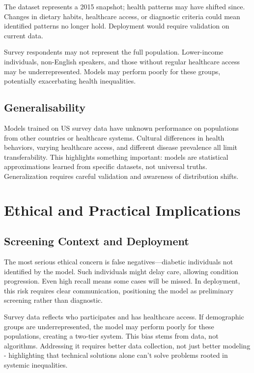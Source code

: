 \documentclass[12pt,a4paper]{article}
\begin{document}
The dataset represents a 2015 snapshot; health patterns may have shifted since. Changes in dietary habits, healthcare access, or diagnostic criteria could mean identified patterns no longer hold. Deployment would require validation on current data.

Survey respondents may not represent the full population. Lower-income individuals, non-English speakers, and those without regular healthcare access may be underrepresented. Models may perform poorly for these groups, potentially exacerbating health inequalities.

\subsection{Generalisability}

Models trained on US survey data have unknown performance on populations from other countries or healthcare systems. Cultural differences in health behaviors, varying healthcare access, and different disease prevalence all limit transferability. This highlights something important: models are statistical approximations learned from specific datasets, not universal truths. Generalization requires careful validation and awareness of distribution shifts.

\section{Ethical and Practical Implications}

\subsection{Screening Context and Deployment}

The most serious ethical concern is false negatives—diabetic individuals not identified by the model. Such individuals might delay care, allowing condition progression. Even high recall means some cases will be missed. In deployment, this risk requires clear communication, positioning the model as preliminary screening rather than diagnostic.

Survey data reflects who participates and has healthcare access. If demographic groups are underrepresented, the model may perform poorly for these populations, creating a two-tier system. This bias stems from data, not algorithms. Addressing it requires better data collection, not just better modeling - highlighting that technical solutions alone can't solve problems rooted in systemic inequalities.
\end{document}
